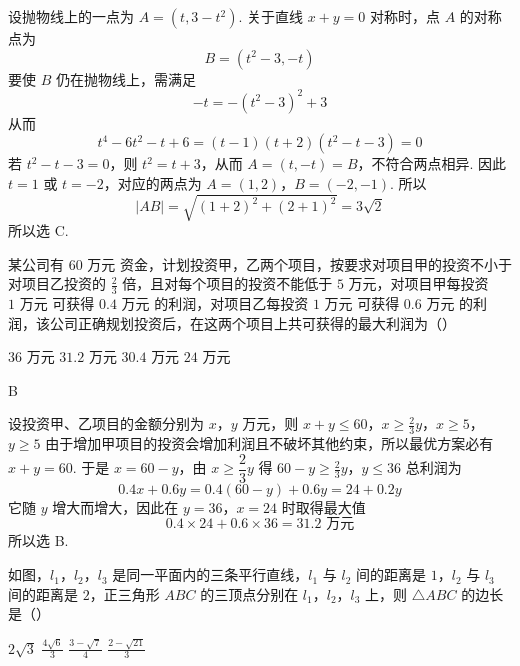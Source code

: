 \begin{solution}
设抛物线上的一点为 \(A=(t,3-t^{2})\). 关于直线 \(x+y=0\) 对称时，点 \(A\) 的对称点为
\[
B=(t^{2}-3,-t)
\]
要使 \(B\) 仍在抛物线上，需满足
\[
-t=-\left(t^{2}-3\right)^{2}+3
\]
从而
\[
t^{4}-6t^{2}-t+6=(t-1)(t+2)(t^{2}-t-3)=0
\]
若 \(t^{2}-t-3=0\)，则 \(t^{2}=t+3\)，从而 \(A=(t,-t)=B\)，不符合两点相异. 因此 \(t=1\) 或 \(t=-2\)，对应的两点为 \(A=(1,2)\)，\(B=(-2,-1)\).
所以
\[
|AB|=\sqrt{(1+2)^{2}+(2+1)^{2}}=3\sqrt2
\]
所以选 C.
\end{solution}

\begin{problem}
某公司有 \(60\text{ 万元}\) 资金，计划投资甲，乙两个项目，按要求对项目甲的投资不小于对项目乙投资的 \(\frac{2}{3}\) 倍，且对每个项目的投资不能低于 \(5\text{ 万元}\)，对项目甲每投资 \(1\text{ 万元}\) 可获得 \(0.4\text{ 万元}\) 的利润，对项目乙每投资 \(1\text{ 万元}\) 可获得 \(0.6\text{ 万元}\) 的利润，该公司正确规划投资后，在这两个项目上共可获得的最大利润为（\quad）

\choices
    {\(36\text{ 万元}\)}
    {\(31.2\text{ 万元}\)}
    {\(30.4\text{ 万元}\)}
    {\(24\text{ 万元}\)}
\end{problem}

\begin{answer}
B
\end{answer}

\begin{solution}
设投资甲、乙项目的金额分别为 \(x\)，\(y\) 万元，则
\(x+y\leqslant60\)，\(x\geqslant\frac23y\)，\(x\geqslant5\)，\(y\geqslant5\)
由于增加甲项目的投资会增加利润且不破坏其他约束，所以最优方案必有 \(x+y=60\). 于是 \(x=60-y\)，由 \(x\geqslant\dfrac23y\) 得
\(60-y\geqslant\frac23y\)，\(y\leqslant36\)
总利润为
\[
0.4x+0.6y=0.4(60-y)+0.6y=24+0.2y
\]
它随 \(y\) 增大而增大，因此在 \(y=36\)，\(x=24\) 时取得最大值
\[
0.4\times24+0.6\times36=31.2\text{ 万元}
\]
所以选 B.
\end{solution}

\begin{problem}
如图，\(l_{1}\)，\(l_{2}\)，\(l_{3}\) 是同一平面内的三条平行直线，\(l_{1}\) 与 \(l_{2}\) 间的距离是 \(1\)，\(l_{2}\) 与 \(l_{3}\) 间的距离是 \(2\)，正三角形 \(ABC\) 的三顶点分别在 \(l_{1}\)，\(l_{2}\)，\(l_{3}\) 上，则 \(\triangle ABC\) 的边长是（\quad）


\choices
    {\(2\sqrt{3}\)}
    {\(\frac{4\sqrt{6}}{3}\)}
    {\(\frac{3 - \sqrt{7}}{4}\)}
    {\(\frac{2 - \sqrt{21}}{3}\)}
\end{problem}

